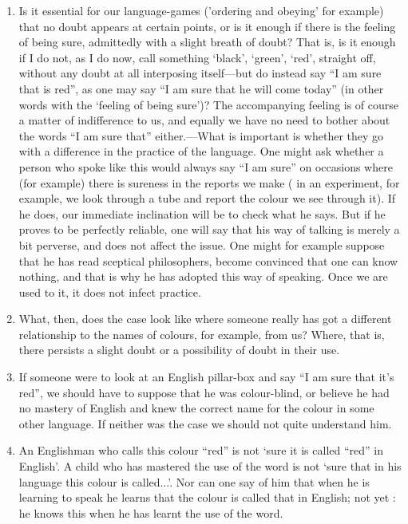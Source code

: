 \documentclass{book}
\begin{document}
\begin{enumerate}
\item
Is it essential for our language-games ('ordering and obeying' for example)
that no doubt appears at certain points, or is it enough if there is the
feeling of being sure, admittedly with a slight breath of doubt?  That is, is
it enough if I do not, as I do now, call something `black', `green', `red',
straight off, without any doubt at all interposing itself---but do instead say
``I am sure that is red'', as one may say ``I am sure that he will come today''
(in other words with the `feeling of being sure')?  The accompanying feeling is
of course a matter of indifference to us, and equally we have no need to bother
about the words ``I am sure that'' either.---What is important is whether they
go with a difference in the practice of the language.  One might ask whether a
person who spoke like this would always say ``I am sure'' on occasions where
(for example) there is sureness in the reports we make ( in an experiment, for
example, we look through a tube and report the colour we see through it). If he
does, our immediate inclination will be to check what he says. But if he proves
to be perfectly reliable, one will say that his way of talking is merely a bit
perverse, and does not affect the issue. One might for example suppose that he
has read sceptical philosophers, become convinced that one can know nothing,
and that is why he has adopted this way of speaking. Once we are used to it, it
does not infect practice.

\item
What, then, does the case look like where someone really has got a different
relationship to the names of colours, for example, from us? Where, that is,
there persists a slight doubt or a possibility of doubt in their use.

\item
If someone were to look at an English pillar-box and say ``I am sure that it's
red'', we should have to suppose that he was colour-blind, or believe he had no
mastery of English and knew the correct name for the colour in some other
language.  If neither was the case we should not quite understand him.

\item
An Englishman who calls this colour ``red'' is not `sure it is called ``red''
in English'.  A child who has mastered the use of the word is not `sure that in
his language this colour is called...'. Nor can one say of him that when he is
learning to speak he learns that the colour is called that in English; not yet
: he knows this when he has learnt the use of the word.


\end{enumerate}
\end{document}
